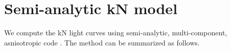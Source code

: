 
















\section{Semi-analytic \ac{kN} model}\label{sec:kilonova:albino}

We compute the \ac{kN} light curves using 
semi-analytic, multi-component, asnisotropic code \mkn{} 
\citep{Perego:2017wtu,Barbieri:2019sjc,Breschi:2021wzr}. 
%
%
The method can be summarized as follows. 


